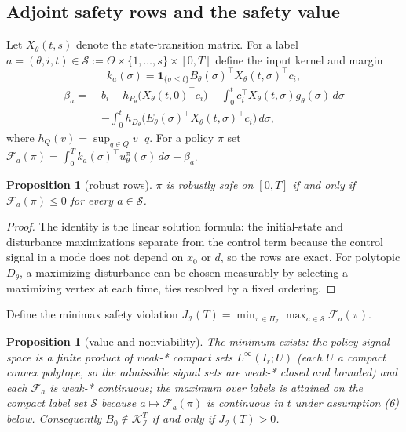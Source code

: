 \documentclass[10pt,twocolumn]{article}
\theoremstyle{plain}
\newtheorem{proposition}[theorem]{Proposition}
\theoremstyle{definition}
\theoremstyle{remark}
\begin{document}
\subsection{Adjoint safety rows and the safety value}\label{rows}

Let \(X_\theta(t,s)\) denote the state-transition matrix. For a label
\(a = (\theta, i, t) \in \mathscr{S} := \Theta \times \{1,\dots,s\} \times
[0,T]\) define the input kernel and margin
\[
k_a(\sigma) = \mathbf{1}_{\{\sigma \le t\}} B_\theta(\sigma)^\top
X_\theta(t,\sigma)^\top c_i,
\]
\begin{align*}
\beta_a = \;& b_i - h_{P_\theta}\!\bigl(X_\theta(t,0)^\top c_i\bigr)
- \int_0^t c_i^\top X_\theta(t,\sigma) g_\theta(\sigma)\, d\sigma\\
& - \int_0^t h_{D_\theta}\!\bigl(E_\theta(\sigma)^\top
X_\theta(t,\sigma)^\top c_i\bigr)\, d\sigma,
\end{align*}
where \(h_Q(v) = \sup_{q \in Q} v^\top q\). For a policy \(\pi\) set
\(\mathcal{F}_a(\pi) = \int_0^T k_a(\sigma)^\top u^\pi_\theta(\sigma)\,
d\sigma - \beta_a\).

\begin{proposition}[robust rows]\label{prop:rows}
\(\pi\) is robustly safe on \([0,T]\) if and only if
\(\mathcal{F}_a(\pi) \le 0\) for every \(a \in \mathscr{S}\).
\end{proposition}

\begin{proof}
The identity is the linear solution formula: the initial-state and
disturbance maximizations separate from the control term because the
control signal in a mode does not depend on \(x_0\) or \(d\), so the
rows are exact. For polytopic \(D_\theta\), a maximizing disturbance
can be chosen measurably by selecting a maximizing vertex at each time,
ties resolved by a fixed ordering.
\end{proof}

Define the minimax safety violation
\(J_{\mathcal{I}}(T) = \min_{\pi \in \Pi_{\mathcal{I}}} \max_{a \in
\mathscr{S}} \mathcal{F}_a(\pi)\).

\begin{proposition}[value and nonviability]\label{prop:value}
The minimum exists: the policy-signal space is a finite product of
weak-* compact sets \(L^\infty(I_r; U)\) (each \(U\) a compact convex
polytope, so the admissible signal sets are weak-* closed and bounded) and
each \(\mathcal{F}_a\) is weak-* continuous; the maximum over labels is
attained on the compact label set \(\mathscr{S}\) because
\(a \mapsto \mathcal{F}_a(\pi)\) is continuous in \(t\) under
assumption (6) below. Consequently
\(B_0 \notin \mathcal{K}_{\mathcal{I}}^T\) if and only if
\(J_{\mathcal{I}}(T) > 0\).
\end{proposition}
\end{document}
